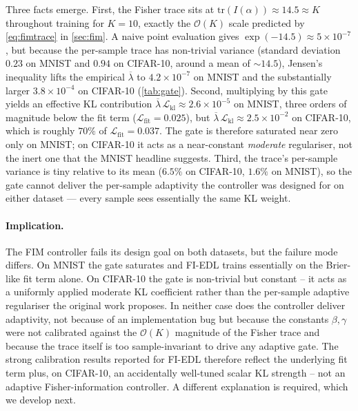 \documentclass[review,5p,times]{elsarticle}
\begin{document}
Three facts emerge. First, the Fisher trace sits at
$\mathrm{tr}(I(\alpha))\!\approx\!14.5\!\approx\!K$ throughout training for
$K\!=\!10$, exactly the $\mathcal{O}(K)$ scale predicted by
\eqref{eq:fimtrace} in \autoref{sec:fim}. A naive point evaluation gives
$\exp(-14.5)\!\approx\!5\!\times\!10^{-7}$, but because the per-sample
trace has non-trivial variance (standard deviation $0.23$ on MNIST and
$0.94$ on CIFAR-10, around a mean of $\sim\!14.5$), Jensen's inequality
lifts the empirical $\overline{\lambda}$ to $4.2\!\times\!10^{-7}$ on
MNIST and the substantially larger $3.8\!\times\!10^{-4}$ on CIFAR-10
(\autoref{tab:gate}). Second, multiplying by this gate yields an
effective KL contribution
$\overline{\lambda}\,\mathcal{L}_{\text{kl}}\!\approx\!2.6\!\times\!10^{-5}$
on MNIST, three orders of magnitude below the fit term
($\mathcal{L}_{\text{fit}}\!=\!0.025$), but
$\overline{\lambda}\,\mathcal{L}_{\text{kl}}\!\approx\!2.5\!\times\!10^{-2}$
on CIFAR-10, which is roughly $70\%$ of
$\mathcal{L}_{\text{fit}}\!=\!0.037$. The gate is therefore saturated
near zero only on MNIST; on CIFAR-10 it acts as a near-constant
\emph{moderate} regulariser, not the inert one that the MNIST headline
suggests. Third, the trace's per-sample variance is tiny relative to its
mean ($6.5\%$ on CIFAR-10, $1.6\%$ on MNIST), so the gate cannot deliver
the per-sample adaptivity the controller was designed for on either
dataset --- every sample sees essentially the same KL weight.

\paragraph{Implication.} The FIM controller fails its design goal on
both datasets, but the failure mode differs. On MNIST the gate saturates
and FI-EDL trains essentially on the Brier-like fit term alone. On
CIFAR-10 the gate is non-trivial but constant -- it acts as a uniformly
applied moderate KL coefficient rather than the per-sample adaptive
regulariser the original work proposes. In neither case does the
controller deliver adaptivity, not because of an implementation bug but
because the constants $\beta,\gamma$ were not calibrated against the
$\mathcal{O}(K)$ magnitude of the Fisher trace and because the trace
itself is too sample-invariant to drive any adaptive gate. The strong
calibration results reported for FI-EDL therefore reflect the underlying
fit term plus, on CIFAR-10, an accidentally well-tuned scalar KL
strength -- not an adaptive Fisher-information controller. A different
explanation is required, which we develop next.
\end{document}
